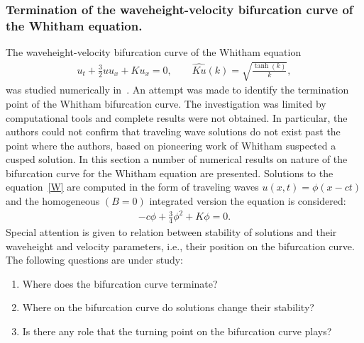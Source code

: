 \subsubsection{Termination of the waveheight-velocity bifurcation curve of the Whitham equation.}
\label{sec-W-term}
The waveheight-velocity bifurcation curve of the Whitham equation 
\begin{align}
	u_t + \frac{3}{2} u u_x + Ku_x = 0, \qquad 
	\widehat{Ku}(k) = \sqrt{\frac{\tanh(k)}{k}},  \label{W}
\end{align}
was studied numerically in~\cite{Ehrnstrom2013}. 	
An attempt was made to identify the termination point of the Whitham bifurcation curve. 
The investigation was limited by computational tools and complete results were not obtained. 
In particular, the authors could not confirm that traveling wave solutions do not exist 
past the point where the authors, based on pioneering work of Whitham
\cite{Whitham1967j} suspected a cusped solution.
In this section a number of numerical results on nature of the bifurcation curve
for the Whitham equation are presented.
Solutions to the equation~\eqref{W}
are computed in the form of traveling waves $u(x,t) = \phi(x - c t)$
and the homogeneous $(B = 0)$ integrated version the equation is considered:
\begin{align}
-c \phi + \frac{3}{4} \phi^2 + K \phi = 0. \label{W-int}
\end{align}
Special attention is given to relation between stability of solutions 
and their waveheight and velocity parameters, i.e., their position on the bifurcation curve. 
The following questions are under study: 
\begin{enumerate}[label=\alph*)] %
\item Where does the bifurcation curve terminate?

\item Where on the bifurcation curve do solutions change their stability?

\item Is there any role that the turning point on the bifurcation curve plays?
\end{enumerate}


